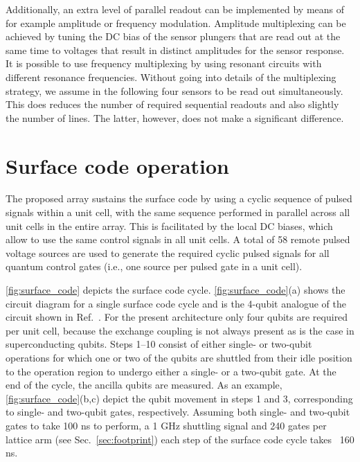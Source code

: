 \documentclass[aps,prl,reprint,superscriptaddress,floatfix]{revtex4-1}
\begin{document}
Additionally, an extra level of parallel readout can be implemented by means of for example amplitude or frequency modulation.
Amplitude multiplexing can be achieved by tuning the DC bias of the sensor plungers that are read out at the same time to voltages that result in distinct amplitudes for the sensor response.
It is possible to use frequency multiplexing by using resonant circuits with different resonance frequencies.
Without going into details of the multiplexing strategy, we assume in the following four sensors to be read out simultaneously.
This does reduces the number of required sequential readouts and also slightly the number of lines. The latter, however, does not make a significant difference.

\section{Surface code operation}
\label{sec:surface_code}
The proposed array sustains the surface code by using a cyclic sequence of pulsed signals within a unit cell, with the same sequence performed in parallel across all unit cells in the entire array.
This is facilitated by the local DC biases, which allow to use the same control signals in all unit cells.
A total of 58 remote pulsed voltage sources are used to generate the required cyclic pulsed signals for all quantum control gates (i.e., one source per pulsed gate in a unit cell).

\autoref{fig:surface_code} depicts the surface code cycle. 
\autoref{fig:surface_code}(a) shows the circuit diagram for a single surface code cycle and is the 4-qubit analogue of the circuit shown in Ref.~\cite{Versluis2017}. For the present architecture only four qubits are required per unit cell, because the exchange coupling is not always present as is the case in superconducting qubits.
Steps 1--10 consist of either single- or two-qubit operations for which one or two of the qubits are shuttled from their idle position to the operation region to undergo either a single- or a two-qubit gate.
At the end of the cycle, the ancilla qubits are measured.
As an example, \autoref{fig:surface_code}(b,c) depict the qubit movement in steps 1 and 3, corresponding to single- and two-qubit gates, respectively.
Assuming both single- and two-qubit gates to take 100 ns to perform, a 1 GHz shuttling signal and 240 gates per lattice arm (see Sec.~\ref{sec:footprint}) each step of the surface code cycle takes ~160 ns.
\end{document}
